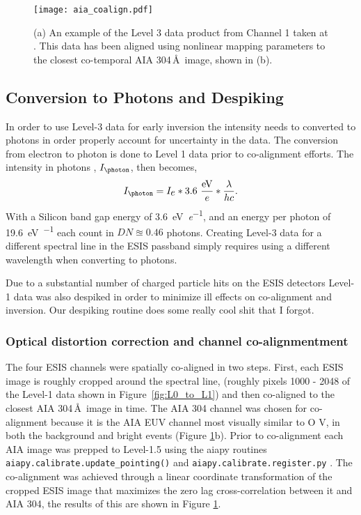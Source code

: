  		\begin{figure}[htb!]
    		\centering
    		\texttt{[image: aia\_coalign.pdf]}
    		\caption{(a) An example of the Level 3 data product from Channel 1 taken at \levthreetime. This data has been aligned using nonlinear mapping parameters to the closest co-temporal AIA 304\,\AA\ image, shown in (b).   }
    		\label{fig:coalign}
    	\end{figure}
    	
    
    \subsection{Conversion to Photons and Despiking}
        In order to use Level-3 data for early inversion the intensity needs to  converted to photons in order properly account for uncertainty in the data.
        The conversion from electron to photon is done to Level 1 data prior to co-alignment efforts.
   		The intensity in photons , $I_{\photon}$, then becomes,
   		\begin{equation}
	   		I_{\photon} = I_{\SI{}{\elementarycharge}} * 3.6\ \frac{\SI{}{\electronvolt}}{\SI{}{\elementarycharge}} * \frac{\lambda}{hc}.
   		\end{equation}
		With a Silicon band gap energy of \SI[per-mode=symbol]{3.6}{\electronvolt\per\elementarycharge}, and an energy per \ov photon of \SI[per-mode=symbol]{19.6}{\electronvolt\per\photon} each count in $DN \approxeq 0.46$ photons.
		Creating Level-3 data for a different spectral line in the ESIS passband simply requires using a different wavelength when converting to photons.
		
		Due to a substantial number of charged particle hits on the ESIS detectors Level-1 data was also despiked in order to minimize ill effects on co-alignment and inversion.
		Our despiking routine does some really cool shit that I forgot.

    \subsubsection{Optical distortion correction and channel co-alignmentment}
   		
   	    The four ESIS channels were spatially co-aligned in two steps.
        First, each ESIS image is roughly cropped around the \ov spectral line, (roughly pixels 1000 - 2048 of the Level-1 data shown in Figure~\ref{fig:L0_to_L1}) and then co-aligned to the closest AIA 304\,\AA\ image in time.  
        The AIA 304 channel was chosen for co-alignment because it is the AIA EUV channel most visually similar to O V, in both the background and bright events (Figure \ref{fig:coalign}b).
        Prior to co-alignment each AIA image was prepped to Level-1.5 using the aiapy routines \texttt{aiapy.calibrate.update\_pointing()} and \texttt{aiapy.calibrate.register.py}  \citep{aiapy}.
        The co-alignment was achieved through a linear coordinate transformation of the cropped ESIS image that maximizes the zero lag cross-correlation between it and AIA 304, the results of this are shown in Figure \ref{fig:coalign}.
        
